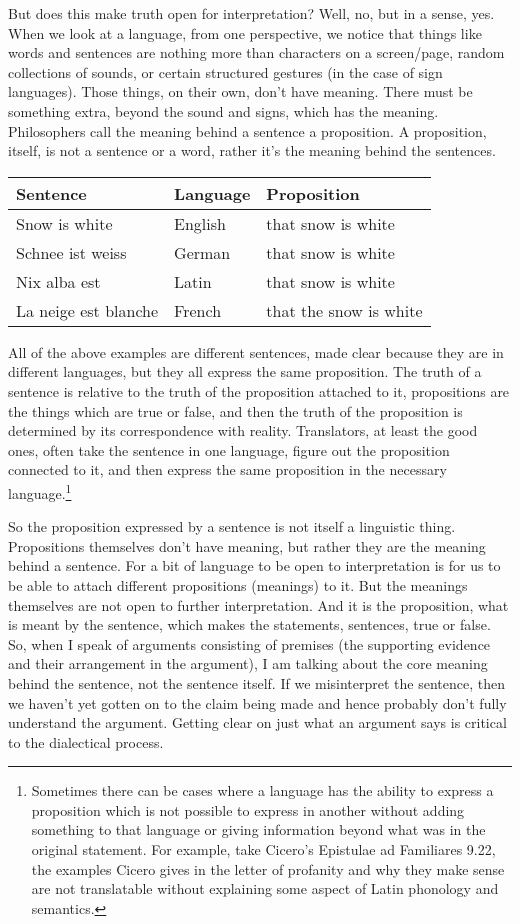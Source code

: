 But does this make truth open for interpretation? Well, no, but in a sense, yes. When we look at a language, from one perspective, we notice that things like words and sentences are nothing more than characters on a screen/page, random collections of sounds, or certain structured gestures (in the case of sign languages). Those things, on their own, don't have meaning. There must be something extra, beyond the sound and signs, which has the meaning.  Philosophers call the meaning behind a sentence a proposition. A proposition, itself, is not a sentence or a word, rather it's the meaning behind the sentences.

\begin{tabular}{p{1in}|p{1in}|p{1in}}\hline
Sentence &Language &Proposition\\\hline
Snow is white &English &that snow is white\\\hline
Schnee ist weiss &German &that snow is white\\\hline
Nix alba est &Latin &that snow is white\\\hline
La neige est blanche &French &that the snow is white\\\hline
\end{tabular}

All of the above examples are different sentences, made clear because they are in different languages, but they all express the same proposition. The truth of a sentence is relative to the truth of the proposition attached to it, propositions are the things which are true or false, and then the truth of the proposition is determined by its correspondence with reality. Translators, at least the good ones, often take the sentence in one language, figure out the proposition connected to it, and then express the same proposition in the necessary language.\footnote{Sometimes there can be cases where a language has the ability to express a proposition which is not possible to express in another without adding something to that language or giving information beyond what was in the original statement. For example, take Cicero's Epistulae ad Familiares 9.22, the examples Cicero gives in the letter of profanity and why they make sense are  not translatable without explaining some aspect of Latin phonology and semantics.}

So the proposition expressed by a sentence is not itself a linguistic thing. Propositions themselves don't have meaning, but rather they are the meaning behind a sentence. For a bit of language to be open to interpretation is for us to be able to attach different propositions (meanings) to it. But the meanings themselves are not open to further interpretation. And it is the proposition, what is meant by the sentence, which makes the statements, sentences, true or false. So, when I speak of arguments consisting of premises (the supporting evidence and their arrangement in the argument), I am talking about the core meaning behind the sentence, not the sentence itself. If we misinterpret the sentence, then we haven’t yet gotten on to the claim being made and hence probably don’t fully understand the argument. Getting clear on just what an argument says is critical to the dialectical process.

